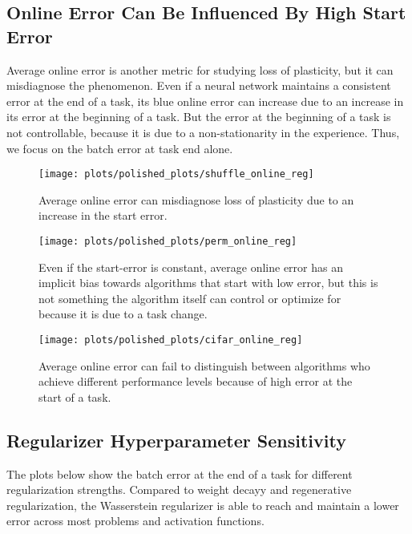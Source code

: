 \clearpage
\subsection{Online Error Can Be Influenced By High Start Error}
\label{appendix:online_error}
Average online error is another metric for studying loss of plasticity, but it can misdiagnose the phenomenon.
Even if a neural network maintains a consistent error at the end of a task, its blue online error can increase due to an increase in its error at the beginning of a task.
But the error at the beginning of a task is not controllable, because it is due to a non-stationarity in the experience.
Thus, we focus on the batch error at task end alone.
\begin{figure}[h!]
  \centering
  \texttt{[image: plots/polished\_plots/shuffle\_online\_reg]}
    \caption{Average online error can misdiagnose loss of plasticity due to an increase in the start error.}
    \label{fig:online_shuffle}
  \end{figure}

\begin{figure}[H]
  \centering
  \texttt{[image: plots/polished\_plots/perm\_online\_reg]}
    \caption{Even if the start-error is constant, average online error has an implicit bias towards algorithms that start with low error, but this is not something the algorithm itself can control or optimize for because it is due to a task change.}
    \label{fig:online_perm}
  \end{figure}

\begin{figure}[H]
  \centering
  \texttt{[image: plots/polished\_plots/cifar\_online\_reg]}
    \caption{Average online error can fail to distinguish between algorithms who achieve different performance levels because of high error at the start of a task.}
    \label{fig:online_cifar}
  \end{figure}

\clearpage
\subsection{Regularizer Hyperparameter Sensitivity}
\label{appendix:reg_hyperparam}

The plots below show the batch error at the end of a task for different regularization strengths. Compared to weight decayy and regenerative regularization, the Wasserstein regularizer is able to reach and maintain a lower error across most problems and activation functions.


